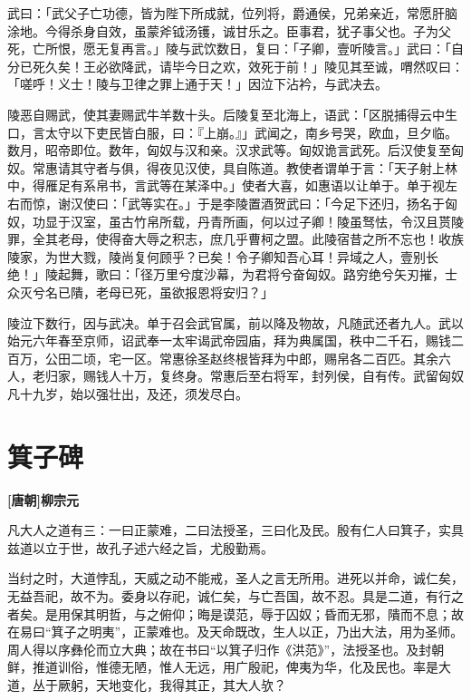 \documentclass[UTF8,titlepage,oneside]{ctexbook}
\begin{document}
武曰：「武父子亡功德，皆为陛下所成就，位列将，爵通侯，兄弟亲近，常愿肝脑涂地。今得杀身自效，虽蒙斧钺汤镬，诚甘乐之。臣事君，犹子事父也。子为父死，亡所恨，愿无复再言。」陵与武饮数日，复曰：「子卿，壹听陵言。」武曰：「自分已死久矣！王必欲降武，请毕今日之欢，效死于前！」陵见其至诚，喟然叹曰：「嗟呼！义士！陵与卫律之罪上通于天！」因泣下沾衿，与武决去。


陵恶自赐武，使其妻赐武牛羊数十头。后陵复至北海上，语武：「区脱捕得云中生口，言太守以下吏民皆白服，曰：『上崩。』」武闻之，南乡号哭，欧血，旦夕临。数月，昭帝即位。数年，匈奴与汉和亲。汉求武等。匈奴诡言武死。后汉使复至匈奴。常惠请其守者与俱，得夜见汉使，具自陈道。教使者谓单于言：「天子射上林中，得雁足有系帛书，言武等在某泽中。」使者大喜，如惠语以让单于。单于视左右而惊，谢汉使曰：「武等实在。」于是李陵置酒贺武曰：「今足下还归，扬名于匈奴，功显于汉室，虽古竹帛所载，丹青所画，何以过子卿！陵虽驽怯，令汉且贳陵罪，全其老母，使得奋大辱之积志，庶几乎曹柯之盟。此陵宿昔之所不忘也！收族陵家，为世大戮，陵尚复何顾乎？已矣！令子卿知吾心耳！异域之人，壹别长绝！」陵起舞，歌曰：「径万里兮度沙幕，为君将兮奋匈奴。路穷绝兮矢刃摧，士众灭兮名已隤，老母已死，虽欲报恩将安归？」


陵泣下数行，因与武决。单于召会武官属，前以降及物故，凡随武还者九人。武以始元六年春至京师，诏武奉一太牢谒武帝园庙，拜为典属国，秩中二千石，赐钱二百万，公田二顷，宅一区。常惠徐圣赵终根皆拜为中郎，赐帛各二百匹。其余六人，老归家，赐钱人十万，复终身。常惠后至右将军，封列侯，自有传。武留匈奴凡十九岁，始以强壮出，及还，须发尽白。



\chapter*{箕子碑}
\begin{center}
	\textbf{[唐朝]柳宗元}
\end{center}


凡大人之道有三：一曰正蒙难，二曰法授圣，三曰化及民。殷有仁人曰箕子，实具兹道以立于世，故孔子述六经之旨，尤殷勤焉。


当纣之时，大道悖乱，天威之动不能戒，圣人之言无所用。进死以并命，诚仁矣，无益吾祀，故不为。委身以存祀，诚仁矣，与亡吾国，故不忍。具是二道，有行之者矣。是用保其明哲，与之俯仰；晦是谟范，辱于囚奴；昏而无邪，隤而不息；故在易曰“箕子之明夷”，正蒙难也。及天命既改，生人以正，乃出大法，用为圣师。周人得以序彝伦而立大典；故在书曰“以箕子归作《洪范》”，法授圣也。及封朝鲜，推道训俗，惟德无陋，惟人无远，用广殷祀，俾夷为华，化及民也。率是大道，丛于厥躬，天地变化，我得其正，其大人欤？
\end{document}
